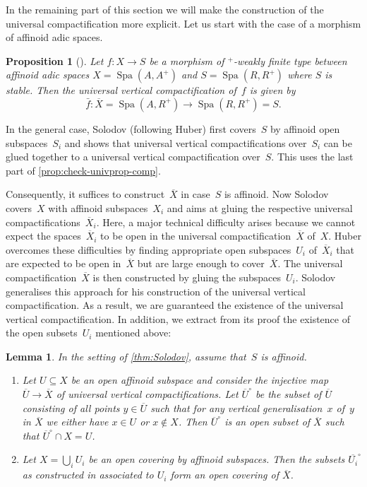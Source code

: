 \documentclass[a4paper,twoside,11pt,reqno]{amsart}
\DeclareMathOperator{\Spa}{Spa}
\newcommand{\ov}[1]{\overline{#1}}
\newtheorem{prop}[thm]{Proposition}
\newtheorem{lem}[thm]{Lemma}
\theoremstyle{definition}
\numberwithin{equation}{subsection}
\begin{document}
In the remaining part of this section we will make the construction of the universal compactification more explicit.
Let us start with the case of a morphism of affinoid adic spaces.

\begin{prop}[{\cite[Theorem~3.14]{Solodov-vertical-compactification}}] \label{prop:affinoid-compactification}
    Let $f\colon X\to S$ be a morphism of ${}^+$-weakly finite type between affinoid adic spaces $X = \Spa(A,A^+)$ and $S = \Spa(R,R^+)$ where $S$ is stable.
    Then the universal vertical compactification of~$f$ is given by
    \[
     \bar{f} \colon \overline{X} = \Spa(A,R^+) \longrightarrow \Spa(R,R^+) = S.
    \]   
\end{prop}

In the general case, Solodov (following Huber) first covers~$S$ by affinoid open subspaces~$S_i$ and shows that universal vertical compactifications over~$S_i$ can be glued together to a universal vertical compactification over~$S$.
This uses the last part of \cref{prop:check-univprop-comp}.

Consequently, it suffices to construct~$\ov X$ in case~$S$ is affinoid.
Now Solodov covers~$X$ with affinoid subspaces~$X_i$ and aims at gluing the respective universal compactifications~$\overline{X}_i$.
Here, a major technical difficulty arises because we cannot expect the spaces~$\overline{X}_i$ to be open in the universal compactification~$\overline{X}$ of~$X$.
Huber overcomes these difficulties by finding appropriate open subspaces~$U_i$ of~$\overline{X}_i$ that are expected to be open in~$\overline{X}$ but are large enough to cover~$\overline{X}$.
The universal compactification~$\overline{X}$ is then constructed by gluing the subspaces~$U_i$.
Solodov generalises this approach for his construction of the universal vertical compactification.
As a result, we are guaranteed the existence of the universal vertical compactification.
In addition, we extract from its proof the existence of the open subsets~$U_i$ mentioned above:

\begin{lem} \label{lem:interiors-cover}
    In the setting of \cref{thm:Solodov}, assume that~$S$ is affinoid. 
    \begin{enumerate}[(1)]
        \item \label{lemitem:interior-open}
        Let $U \subseteq X$ be an open affinoid subspace and consider the injective map $\ov{U} \to \ov{X}$ of universal vertical compactifications. Let $\ov{U}^\circ$ be the subset of $\ov{U}$ consisting of all points $y \in \ov{U}$ such that for any vertical generalisation~$x$ of~$y$ in $\ov{X}$ we either have $x \in U$ or $x \notin X$. 
        Then $\ov{U}^\circ$ is an open subset of $\ov{X}$ such that $\ov{U}^\circ \cap X = U$.

        \item \label{lemitem:interior-open-covering}
        Let $X = \bigcup_i U_i$ be an open covering by affinoid subspaces. Then the subsets $\ov{U_i}^\circ$ as constructed in  associated to $U_i$ form an open covering of $\ov{X}$.
    \end{enumerate}
\end{lem}
\end{document}
